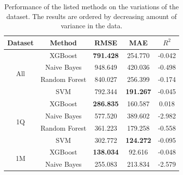 \documentclass[conference,compsoc]{IEEEtran}
\begin{document}
\begin{table}[!t]
	\label{model-performance}
	\centering
	\caption{Performance of the listed methods on the variations of the dataset. The results are ordered by decreasing amount of variance in the data.}
	\begin{tabular}{c|c|c|c|c}
		Dataset & Method & RMSE & MAE & $R^2$ \\
		\hline
		\multirow{4}{*}{All}
		&XGBoost& \textbf{791.428} & 254.770 & -0.042 \\
		&Naive Bayes& 948.649 & 420.036 & -0.498 \\
		&Random Forest& 840.027 & 256.399 & -0.174 \\
		& SVM & 792.344 & \textbf{191.267} & -0.045 \\
		\hline
		\multirow{4}{*}{1Q}
		&XGBoost& \textbf{286.835} & 160.587 & 0.018 \\
		&Naive Bayes& 577.520 & 389.602 & -2.982 \\
		&Random Forest& 361.223 & 179.258 & -0.558 \\
		& SVM & 302.772 & \textbf{124.272} & -0.095 \\
		\hline
		\multirow{4}{*}{1M}
		&XGBoost& \textbf{138.034} & 92.616 & -0.048 \\
		&Naive Bayes& 255.083 & 213.834 & -2.579 \\

\end{tabular}
\end{table}
\end{document}

